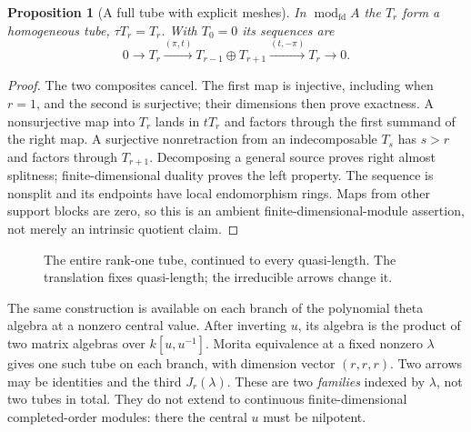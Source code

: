 \documentclass[11pt,oneside,openany]{book}
\newtheorem{proposition}[theorem]{Proposition}
\theoremstyle{definition}\newtheorem{definition}[theorem]{Definition}
\theoremstyle{remark}\newtheorem{remark}[theorem]{Remark}
\begin{document}
\begin{proposition}[A full tube with explicit meshes]\label{arb:tube}
In $\operatorname{mod}_{\mathrm{fd}}A$ the $T_r$ form a homogeneous tube,
$\tau T_r=T_r$. With $T_0=0$ its sequences are
\[
 0\to T_r\xrightarrow{(\pi,t)}T_{r-1}\oplus T_{r+1}
      \xrightarrow{(t,-\pi)}T_r\to0.
\]
\end{proposition}
\begin{proof}
The two composites cancel. The first map is injective, including when $r=1$,
and the second is surjective; their dimensions then prove exactness.
A nonsurjective map into $T_r$ lands in $tT_r$ and factors through the first
summand of the right map. A surjective nonretraction from an indecomposable
$T_s$ has $s>r$ and factors through $T_{r+1}$. Decomposing a general source
proves right almost splitness; finite-dimensional duality proves the left
property. The sequence is nonsplit and its endpoints have local endomorphism
rings. Maps from other support blocks are zero, so this is an ambient
finite-dimensional-module assertion, not merely an intrinsic quotient claim.
\end{proof}

\begin{figure}[htbp]\centering
{}
\caption{The entire rank-one tube, continued to every quasi-length. The
translation fixes quasi-length; the irreducible arrows change it.}
\end{figure}

The same construction is available on each branch of the polynomial theta
algebra at a nonzero central value. After inverting $u$, its algebra is the
product of two matrix algebras over $k[u,u^{-1}]$. Morita equivalence at a
fixed nonzero $\lambda$ gives one such tube on each branch, with dimension
vector $(r,r,r)$. Two arrows may be identities and the third $J_r(\lambda)$.
These are two \emph{families} indexed by $\lambda$, not two tubes in total.
They do not extend to continuous finite-dimensional completed-order modules:
there the central $u$ must be nilpotent.
\end{document}
